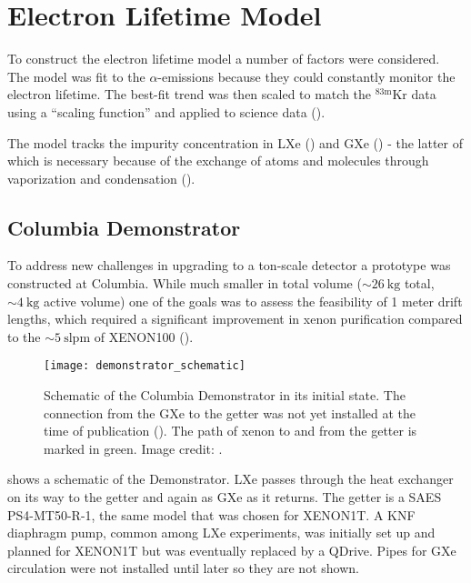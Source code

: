 \section{Electron Lifetime Model}
\label{sec:electron_lifetime_model}
To construct the electron lifetime model a number of factors were considered.  The model was fit to the  $\alpha$-emissions
because they could constantly monitor the electron lifetime.  The best-fit trend was then scaled to match the $\mathrm{^{83m}Kr}$ data
using a ``scaling function'' and applied to science data ().

The model tracks the impurity concentration in LXe (\il) and GXe (\ig) - the latter of which is necessary because of the
exchange of atoms and molecules through vaporization and condensation ().



\subsection{Columbia Demonstrator}
\label{subsec:electron_lifetime_model_demonstrator}
To address new challenges in upgrading to a ton-scale detector a prototype was constructed at Columbia.  While much smaller in total
volume (${\sim}26\ \mathrm{kg}$ total, ${\sim}4\ \mathrm{kg}$ active volume) one of the goals was to assess the feasibility of 1 meter
drift lengths, which required a significant improvement in xenon purification compared to the ${\sim}5\ \mathrm{slpm}$ of XENON100
().

\begin{figure}
\centering
\texttt{[image: demonstrator\_schematic]}
\caption{Schematic of the Columbia Demonstrator in its initial state.  The connection from the GXe to the getter was not yet installed
at the time of publication ().  The path of xenon to and from the getter is marked in
green.  Image credit: .}
\label{fig:electron_lifetime_model_demonstrator_schematic}
\end{figure}

 shows a schematic of the Demonstrator.  LXe passes through the heat exchanger
on its way to the getter and again as GXe as it returns.  The getter is a SAES PS4-MT50-R-1, the same model that was chosen for
XENON1T.  A KNF diaphragm pump, common among LXe experiments, was initially set up and planned for XENON1T but was eventually
replaced by a QDrive.  Pipes for GXe circulation were not installed until later so they are not shown.



